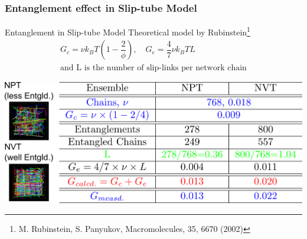 \documentclass[12pt, dvipdfmx]{beamer}
\begin{document}
\begin{frame}
	\frametitle{
		Entanglement effect in Slip-tube Model
	}
	\vspace{-1mm}
	\begin{alertblock}{Entanglement in Slip-tube Model}
			\footnotesize
			Theoretical model by Rubinstein\footnote{
				\scriptsize{M. Rubinstein, S. Panyukov, Macromolecules, 35, 6670 (2002)}
				}
			\vspace{-3mm}
			\scriptsize
			\begin{align*}
				G_c = \nu k_B T \left(1-\dfrac{2}{\phi} \right), \quad G_e = \dfrac{4}{7} \nu k_B T L \\
				\text{and L is the number of slip-links per network chain}
			\end{align*}
	\end{alertblock}
	\vspace{2mm}
	\centering
			\includegraphics[width=.9\textwidth]{Entanglement_Comp.png}
	\scriptsize

\end{frame}
\end{document}
